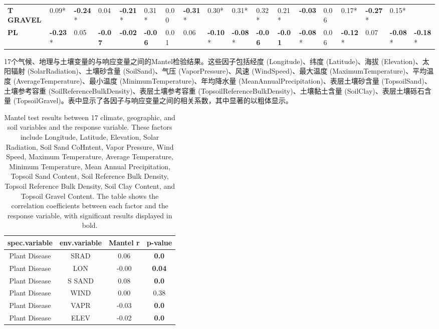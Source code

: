 \documentclass[AutoFakeBold]{LZUThesis-PgD&PhD}
\begin{document}
\begin{table}[H]
\begin{tabular}{p{1.6cm}p{0.68cm}p{0.68cm}p{0.68cm}p{0.68cm}p{0.68cm}p{0.68cm}p{0.68cm}p{0.68cm}p{0.68cm}p{0.68cm}p{0.68cm}p{0.68cm}p{0.68cm}p{0.68cm}p{0.68cm}p{0.68cm}p{0.68cm}}
			\textbf{T GRAVEL} & 0.09* & \textbf{-0.24}* & 0.04 & \textbf{-0.21}* & 0.31* & 0.00 & \textbf{-0.31}* & 0.30* & 0.31* & 0.32* & 0.21* & \textbf{-0.03} & 0.06 & 0.17* & \textbf{-0.27}* & 0.15* &  \\
			\textbf{PL} & \textbf{-0.23}* & 0.05 & \textbf{-0.07} & \textbf{-0.02} & \textbf{-0.06} & 0.01 & 0.06 & \textbf{-0.10}* & \textbf{-0.08}* & \textbf{-0.06} & \textbf{-0.01} & \textbf{-0.08}* & 0.06 & \textbf{-0.12}* & 0.07 & \textbf{-0.08}* & \textbf{-0.18}* \\
			\bottomrule
		\end{tabular}
	\end{table}
	
	\begin{table}[H]
		\centering
		\caption{17个气候、地理与土壤变量的与响应变量之间的Mantel检验结果。这些因子包括经度 (Longitude)、纬度 (Latitude)、海拔 (Elevation)、太阳辐射 (SolarRadiation)、土壤砂含量 (SoilSand)、气压 (VaporPressure)、风速 (WindSpeed)、最大温度 (MaximumTemperature)、平均温度 (AverageTemperature)、最小温度 (MinimumTemperature)、年均降水量 (MeanAnnualPrecipitation)、表层土壤砂含量 (TopsoilSand)、土壤参考容重 (SoilReferenceBulkDensity)、表层土壤参考容重 (TopsoilReferenceBulkDensity)、土壤黏土含量 (SoilClay)、表层土壤砾石含量 (TopsoilGravel)。表中显示了各因子与响应变量之间的相关系数，其中显著的以粗体显示。}
		\caption*{Mantel test results between 17 climate, geographic, and soil variables and the response variable. These factors include Longitude, Latitude, Elevation, Solar Radiation, Soil Sand CoHntent, Vapor Pressure, Wind Speed, Maximum Temperature, Average Temperature, Minimum Temperature, Mean Annual Precipitation, Topsoil Sand Content, Soil Reference Bulk Density, Topsoil Reference Bulk Density, Soil Clay Content, and Topsoil Gravel Content. The table shows the correlation coefficients between each factor and the response variable, with significant results displayed in bold.}
		\begin{tabular}{cccc}
			\toprule
			spec.variable & env.variable & Mantel r & p-value \\
			\midrule
			Plant Disease & SRAD & 0.06 & \textbf{0.0} \\
			Plant Disease & LON & -0.00 & \textbf{0.04} \\
			Plant Disease & S SAND & 0.08 & \textbf{0.0} \\
			Plant Disease & WIND & 0.00 & 0.38 \\
			Plant Disease & VAPR & -0.03 & \textbf{0.0} \\
			Plant Disease & ELEV & -0.02 & \textbf{0.0} \\

\end{tabular}
\end{table}
\end{document}
